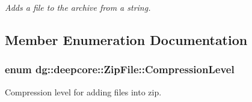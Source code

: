 \begin{DoxyCompactItemize}
\begin{DoxyCompactList}\small\item\em Adds a file to the archive from a string. \end{DoxyCompactList}\end{DoxyCompactItemize}


\subsection{Member Enumeration Documentation}
\subsubsection[{\texorpdfstring{Compression\+Level}{CompressionLevel}}]{\setlength{\rightskip}{0pt plus 5cm}enum {\bf dg\+::deepcore\+::\+Zip\+File\+::\+Compression\+Level}}\hypertarget{classdg_1_1deepcore_1_1_zip_file_afbf537eaa2281817c203388707564bdd}{}\label{classdg_1_1deepcore_1_1_zip_file_afbf537eaa2281817c203388707564bdd}


Compression level for adding files into zip. 

